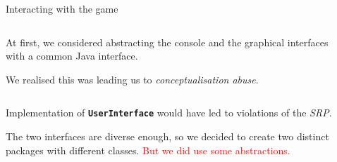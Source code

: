 \documentclass{beamer}
\begin{document}
  \begin{frame}{Interacting with the game}


    \begin{minipage}{\textwidth}
    \begin{columns}[t]
      \begin{column}{0.45\textwidth}

        \justifying
        At first, we considered abstracting the console and the graphical interfaces with a common Java interface.

        \vspace{1em}
        
        We realised this was leading us to \textit{conceptualisation abuse}. 

      \end{column}
      \begin{column}{0.45\textwidth}


      \end{column}
    \end{columns}
    \end{minipage}

    \vspace{2em}

    Implementation of \texttt{\textbf{UserInterface}} would have led to violations of the \textit{SRP}.

    \vspace{1em}

    The two interfaces are diverse enough, so we decided to create two distinct packages with different classes. \textcolor{red}{But we did use some abstractions.}

  \end{frame}
\end{document}
